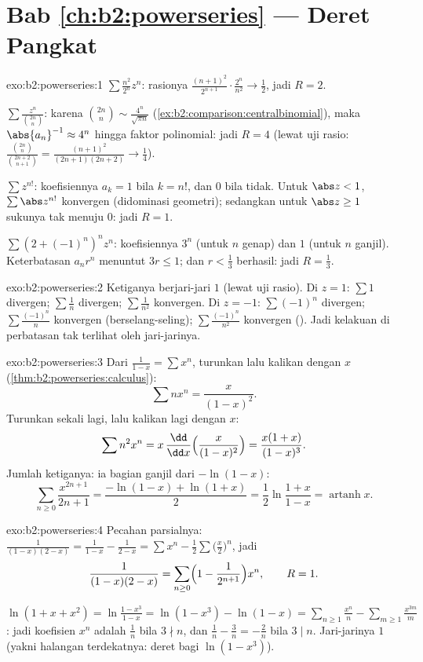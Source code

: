 \section*{Bab \ref{ch:b2:powerseries} --- Deret Pangkat}

\begin{solution}{exo:b2:powerseries:1}
$\sum \frac{n^2}{2^n}z^n$: rasionya $\frac{(n+1)^2}{2^{n+1}}\cdot
\frac{2^n}{n^2} \to \frac12$, jadi $R = 2$.

$\sum \frac{z^n}{\binom{2n}{n}}$: karena $\binom{2n}{n} \sim
\frac{4^n}{\sqrt{\pi n}}$ (\cref{ex:b2:comparison:centralbinomial}),
maka $\abs{a_n}^{-1} \approx 4^n$ hingga faktor polinomial: jadi $R = 4$
(lewat uji rasio: $\frac{\binom{2n}{n}}{\binom{2n+2}{n+1}} =
\frac{(n+1)^2}{(2n+1)(2n+2)} \to \frac14$).

$\sum z^{n!}$: koefisiennya $a_k = 1$ bila $k = n!$, dan $0$ bila tidak.
Untuk $\abs z < 1$, $\sum \abs z^{n!}$ konvergen (didominasi geometri);
sedangkan untuk $\abs z \geq 1$ sukunya tak menuju $0$: jadi $R = 1$.

$\sum (2 + (-1)^n)^n z^n$: koefisiennya $3^n$ (untuk $n$ genap) dan $1$
(untuk $n$ ganjil). Keterbatasan $a_nr^n$ menuntut $3r \leq 1$; dan $r <
\frac13$ berhasil: jadi $R = \frac13$.
\end{solution}

\begin{solution}{exo:b2:powerseries:2}
Ketiganya berjari-jari $1$ (lewat uji rasio). Di $z = 1$: $\sum 1$
divergen; $\sum\frac1n$ divergen; $\sum\frac{1}{n^2}$ konvergen. Di
$z = -1$: $\sum(-1)^n$ divergen; $\sum\frac{(-1)^n}{n}$ konvergen
(berselang-seling); $\sum\frac{(-1)^n}{n^2}$ konvergen ().
Jadi kelakuan di perbatasan tak terlihat oleh jari-jarinya.
\end{solution}

\begin{solution}{exo:b2:powerseries:3}
Dari $\frac{1}{1-x} = \sum x^n$, turunkan lalu kalikan dengan $x$
(\cref{thm:b2:powerseries:calculus}):
\[
\sum n x^n = \frac{x}{(1-x)^2} .
\]
Turunkan sekali lagi, lalu kalikan lagi dengan $x$:
\[
\sum n^2 x^n = x\,\frac{\dd}{\dd x}\Bigl(\frac{x}{(1-x)^2}\Bigr)
= \frac{x(1 + x)}{(1-x)^3} .
\]
Jumlah ketiganya: ia bagian ganjil dari $-\ln(1 - x)$:
\[
\sum_{n\geq0} \frac{x^{2n+1}}{2n+1}
= \frac{-\ln(1-x) + \ln(1+x)}{2}
= \frac12 \ln\frac{1+x}{1-x}
= \operatorname{artanh} x .
\]
\end{solution}

\begin{solution}{exo:b2:powerseries:4}
Pecahan parsialnya: $\frac{1}{(1-x)(2-x)} = \frac{1}{1-x} -
\frac{1}{2 - x} = \sum x^n - \frac12\sum \bigl(\frac x2\bigr)^n$, jadi
\[
\frac{1}{(1-x)(2-x)} = \sum_{n\geq0} \Bigl(1 -
\frac{1}{2^{n+1}}\Bigr)x^n,
\qquad R = 1 .
\]

$\ln(1 + x + x^2) = \ln\frac{1 - x^3}{1 - x} = \ln(1 - x^3) -
\ln(1 - x) = \sum_{n\geq1}\frac{x^n}{n} -
\sum_{m\geq1}\frac{x^{3m}}{m}$: jadi koefisien $x^n$ adalah
$\frac1n$ bila $3 \nmid n$, dan $\frac1n - \frac{3}{n} = -\frac2n$ bila
$3 \mid n$. Jari-jarinya $1$ (yakni halangan terdekatnya: deret bagi
$\ln(1-x^3)$).
\end{solution}

